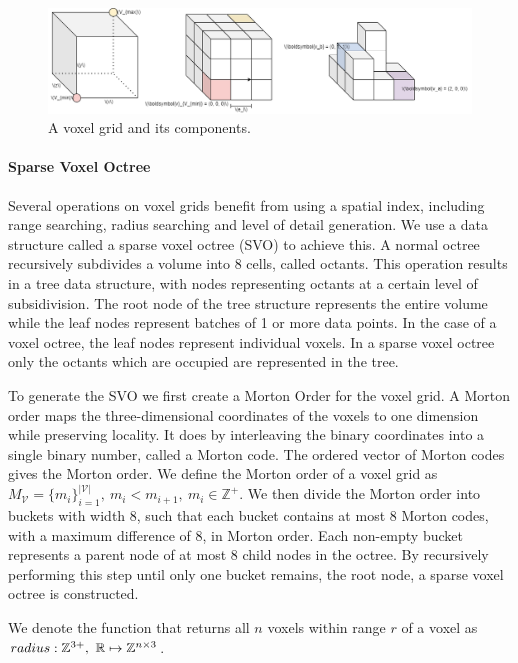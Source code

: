 \begin{figure}[h]
    \centering
    \includegraphics*[width=\textwidth]{./fig/voxels_basic.png}
    \caption{A voxel grid and its components.}
    \label{fig:vg_basic}
\end{figure}

\paragraph{Sparse Voxel Octree}
Several operations on voxel grids benefit from using a spatial index, including range searching, radius searching and level of detail generation. We use a data structure called a sparse voxel octree (SVO) to achieve this. A normal octree recursively subdivides a volume into 8 cells, called octants. This operation results in a tree data structure, with nodes representing octants at a certain level of subsidivision. The root node of the tree structure represents the entire volume while the leaf nodes represent batches of 1 or more data points. In the case of a voxel octree, the leaf nodes represent individual voxels. In a sparse voxel octree only the octants which are occupied are represented in the tree. 

To generate the SVO we first create a Morton Order for the voxel grid. A Morton order maps the three-dimensional coordinates of the voxels to one dimension while preserving locality. It does by interleaving the binary coordinates into a single binary number, called a Morton code. The ordered vector of Morton codes gives the Morton order. We define the Morton order of a voxel grid as \(M_{\mathcal{V}}=\{m_i\}_{i=1}^{|\mathcal{V}|},\ m_i < m_{i+1},\ m_i \in \mathbb{Z^+}\). We then divide the Morton order into buckets with width 8, such that each bucket contains at most 8 Morton codes, with a maximum difference of 8, in Morton order. Each non-empty bucket represents a parent node of at most 8 child nodes in the octree. By recursively performing this step until only one bucket remains, the root node, a sparse voxel octree is constructed. 

We denote the function that returns all \(n\) voxels within range \(r\) of a voxel as \(radius: \mathbb{Z}^{3+},\ \mathbb{R} \mapsto \voxelset\).

